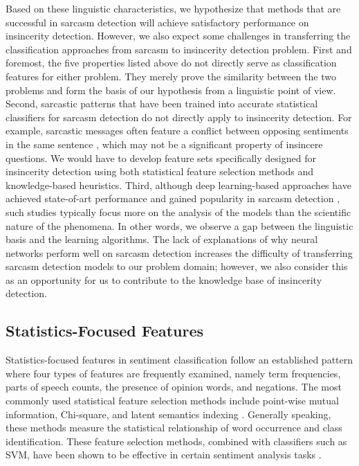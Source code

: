 \documentclass[12pt]{diazessay} %
\begin{document}
Based on these linguistic characteristics, we hypothesize that methods that are successful in sarcasm detection will achieve satisfactory performance on insincerity detection. However, we also expect some challenges in transferring the classification approaches from sarcasm to insincerity detection problem. First and foremost, the five properties listed above do not directly serve as classification features for either problem. They merely prove the similarity between the two problems and form the basis of our hypothesis from a linguistic point of view. Second, sarcastic patterns that have been trained into accurate statistical classifiers for sarcasm detection do not directly apply to insincerity detection. For example, sarcastic messages often feature a conflict between opposing sentiments in the same sentence \citep{joshi2017}, which may not be a significant property of insincere questions. We would have to develop feature sets specifically designed for insincerity detection using both statistical feature selection methods and knowledge-based heuristics. Third, although deep learning-based approaches have achieved state-of-art performance and gained popularity in sarcasm detection \citep{joshi2017}, such studies typically focus more on the analysis of the models than the scientific nature of the phenomena. In other words, we observe a gap between the linguistic basis and the learning algorithms. The lack of explanations of why neural networks perform well on sarcasm detection increases the difficulty of transferring sarcasm detection models to our problem domain; however, we also consider this as an opportunity for us to contribute to the knowledge base of insincerity detection. 

\subsection{Statistics-Focused Features} \label{statistic-features}

Statistics-focused features in sentiment classification follow an established pattern where four types of features are frequently examined, namely term frequencies, parts of speech counts, the presence of opinion words, and negations\citep{medhat2014}. The most commonly used statistical feature selection methods include point-wise mutual information, Chi-square, and latent semantics indexing \citep{medhat2014}. Generally speaking, these methods measure the statistical relationship of word occurrence and class identification. These feature selection methods, combined with classifiers such as SVM, have been shown to be effective in certain sentiment analysis tasks \citep{medhat2014}.
 
\end{document}
